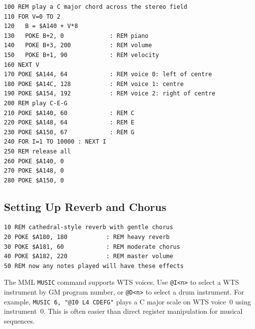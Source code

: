 \begin{lstlisting}
100 REM play a C major chord across the stereo field
110 FOR V=0 TO 2
120   B = $A140 + V*8
130   POKE B+2, 0             : REM piano
140   POKE B+3, 200           : REM volume
150   POKE B+1, 90            : REM velocity
160 NEXT V
170 POKE $A144, 64            : REM voice 0: left of centre
180 POKE $A14C, 128           : REM voice 1: centre
190 POKE $A154, 192           : REM voice 2: right of centre
200 REM play C-E-G
210 POKE $A140, 60            : REM C
220 POKE $A148, 64            : REM E
230 POKE $A150, 67            : REM G
240 FOR I=1 TO 10000 : NEXT I
250 REM release all
260 POKE $A140, 0
270 POKE $A148, 0
280 POKE $A150, 0
\end{lstlisting}

\subsection{Setting Up Reverb and Chorus}

\begin{lstlisting}
10 REM cathedral-style reverb with gentle chorus
20 POKE $A180, 180           : REM heavy reverb
30 POKE $A181, 60            : REM moderate chorus
40 POKE $A182, 220           : REM master volume
50 REM now any notes played will have these effects
\end{lstlisting}

\begin{tipbox}
The MML \texttt{MUSIC} command supports WTS voices.  Use \texttt{@I\textless n\textgreater}
to select a WTS instrument by GM program number, or \texttt{@D\textless n\textgreater}
to select a drum instrument.  For example, \texttt{MUSIC 6, "@I0 L4 CDEFG"} plays
a C major scale on WTS voice~0 using instrument~0.  This is often easier than
direct register manipulation for musical sequences.
\end{tipbox}
